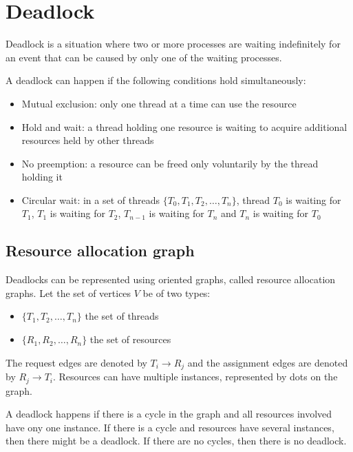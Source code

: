 

\section{Deadlock}
Deadlock is a situation where two or more processes are waiting indefinitely for an event that can be caused by only one of the waiting processes.

A deadlock can happen if the following conditions hold simultaneously:
\begin{itemize}
    \item Mutual exclusion: only one thread at a time can use the resource
    \item Hold and wait: a thread holding one resource is waiting to acquire additional resources held by other threads
    \item No preemption: a resource can be freed only voluntarily by the thread holding it
    \item Circular wait: in a set of threads $\{T_0, T_1, T_2, \dots , T_n\}$, thread $T_0$ is waiting for $T_1$, $T_1$ is waiting for $T_2$, $T_{n-1}$ is waiting for $T_n$ and $T_n$ is waiting for $T_0$
\end{itemize}

\subsection{Resource allocation graph}
Deadlocks can be represented using oriented graphs, called resource allocation graphs. Let the set of vertices $V$ be of two types:
\begin{itemize}
    \item $\{T_1, T_2, \dots, T_n\}$ the set of threads
    \item $\{R_1, R_2, \dots, R_n\}$ the set of resources
\end{itemize}
The request edges are denoted by $T_i \rightarrow R_j$ and the assignment edges are denoted by $R_j \rightarrow T_i$. Resources can have multiple instances, represented by dots on the graph.

A deadlock happens if there is a cycle in the graph and all resources involved have ony one instance. If there is a cycle and resources have several instances, then there might be a deadlock. If there are no cycles, then there is no deadlock.

